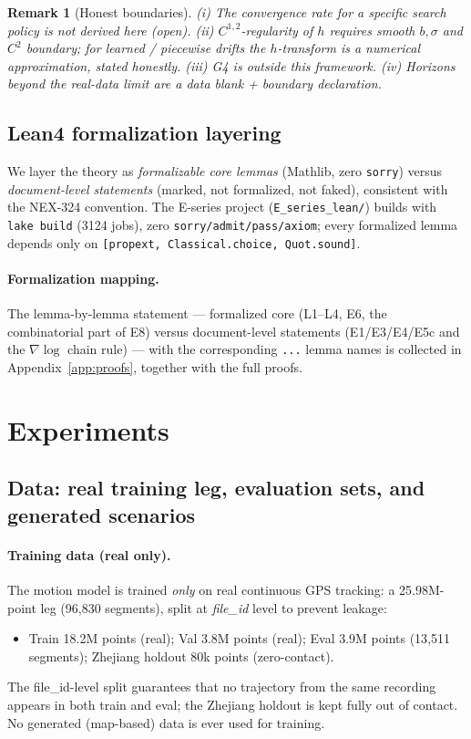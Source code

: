 \documentclass[11pt]{article}
\newtheorem{remark}[theorem]{Remark}
\newcommand{\lean}[1]{\texttt{#1}}
\begin{document}
\begin{remark}[Honest boundaries]
(i) The \emph{convergence rate} for a specific search policy is not derived here (open).
(ii) $C^{1,2}$-regularity of $h$ requires smooth $b,\sigma$ and $C^2$ boundary; for learned /
piecewise drifts the $h$-transform is a numerical approximation, stated honestly. (iii) G4
is outside this framework. (iv) Horizons beyond the real-data limit are a data blank +
boundary declaration.
\end{remark}

\subsection{Lean4 formalization layering}
\label{sec:lean}
We layer the theory as \emph{formalizable core lemmas} (Mathlib, zero \texttt{sorry})
versus \emph{document-level statements} (marked, not formalized, not faked), consistent
with the NEX-324 convention. The E-series project (\texttt{E\_series\_lean/}) builds with
\texttt{lake build} (3124 jobs), zero \texttt{sorry/admit/pass/axiom}; every formalized
lemma depends only on \texttt{[propext, Classical.choice, Quot.sound]}.

\paragraph{Formalization mapping.}
The lemma-by-lemma statement --- formalized core (L1--L4, E6, the combinatorial part of
E8) versus document-level statements (E1/E3/E4/E5c and the $\nabla\log$ chain rule) ---
with the corresponding \lean{...} lemma names is collected in Appendix~\ref{app:proofs},
together with the full proofs.

\section{Experiments}
\label{sec:experiments}

\subsection{Data: real training leg, evaluation sets, and generated scenarios}
\label{sec:exp-data}

\paragraph{Training data (real only).}
The motion model is trained \emph{only} on real continuous GPS tracking: a
25.98M-point leg (96{,}830 segments), split at \emph{file\_id} level to
prevent leakage:
\begin{itemize}
\item Train 18.2M points (real); Val 3.8M points (real); Eval 3.9M points
(13{,}511 segments); Zhejiang holdout 80k points (zero-contact).
\end{itemize}
The file\_id-level split guarantees that no trajectory from the same
recording appears in both train and eval; the Zhejiang holdout is kept
fully out of contact.  No generated (map-based) data is ever used for
training.
\end{document}
